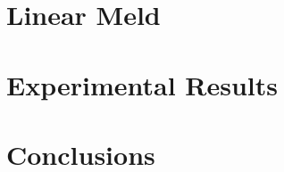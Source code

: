 \documentclass[12pt]{cmuthesis}
\theoremstyle{indented}
\begin{document}
%

%

\chapter{Linear Meld}


%

%

%

%


\chapter{Experimental Results}\label{chapter:exp}


\chapter{Conclusions}


\appendix


\backmatter


\renewcommand{\bibsection}{\chapter{\bibname}}

\end{document}
